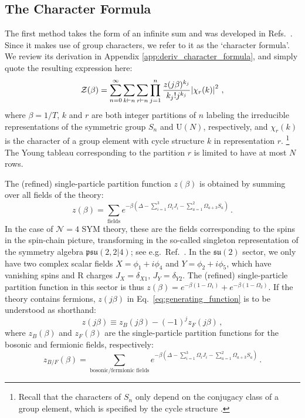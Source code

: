 \documentclass[a4paper,11pt]{article}
\begin{document}
\subsection{The Character Formula}

The first method takes the form of an infinite sum and was developed in Refs.\ \cite{Aharony:2003sx,Dutta:2007ws}. Since it makes use of group characters, we refer to it as the `character formula'. We review its derivation in Appendix \ref{app:deriv_character_formula}, and simply quote the resulting expression here:
% 
\begin{equation} \label{eq:generating_function}
	\mathcal{Z}(\beta) = \sum_{n=0}^\infty \sum_{k\vdash n} \sum_{r\vdash n} \prod_{j=1}^n \frac{z(j\beta)^{k_j}}{k_j! j^{k_j}} \abs{\chi_r(k)}^2 \ ,
\end{equation}
% 
where $\beta=1/T$, $k$ and $r$ are both integer partitions of $n$ labeling the irreducible representations of the symmetric group $S_n$ and $\text{U}(N)$, respectively, and $\chi_r(k)$ is the character of a group element with cycle structure $k$
in representation $r$.%
\footnote{Recall that the characters of $S_n$ only depend on the conjugacy class of a group element, which is specified by the cycle structure \cite{Zee:2016fuk}.}
The Young tableau corresponding to the partition $r$ is limited to have at most $N$ rows.

The (refined) single-particle partition function $z(\beta)$ is obtained by summing over all fields of the theory:
\begin{equation}
 z(\beta)=\sum_{\text{fields}}e^{-\beta(\Delta -\sum_{i=1}^3 \Omega_i J_i - \sum_{a=1}^2 \Omega_{a+3} S_a)}\,.
\end{equation}
In the case of $\mathcal{N}=4$ SYM theory, these are the fields corresponding to the spins in the spin-chain picture, transforming in the so-called singleton representation of the symmetry algebra $\mathfrak{psu}(2,2|4)$; see e.g.\ Ref.\ \cite{Minahan:2010js}.
In the $\mathfrak{su}(2)$ sector, we only have two complex scalar fields $X=\phi_1+i\phi_4$ and $Y=\phi_2+i\phi_5$, which have vanishing spins and R charges $J_X=\delta_{X1}$, $J_Y=\delta_{Y2}$. The (refined) single-particle partition function in this sector is thus $z(\beta)=e^{-\beta(1-\Omega_1)}+e^{-\beta(1-\Omega_2)}$. 
If the theory contains fermions, $z(j\beta)$ in Eq.\ \eqref{eq:generating_function} is to be understood as shorthand: 
\begin{equation}
 z(j\beta) \equiv z_B(j\beta) - (-1)^j z_F(j\beta)\,,
\end{equation}
where $z_B(\beta)$ and $z_F(\beta)$ are the single-particle partition functions for the bosonic and fermionic fields, respectively:
\begin{equation}
 z_{B/F}(\beta)=\sum_{\text{bosonic/fermionic fields}}e^{-\beta(\Delta -\sum_{i=1}^3 \Omega_i J_i - \sum_{a=1}^2 \Omega_{a+3} S_a)}\,.
\end{equation}
\end{document}
